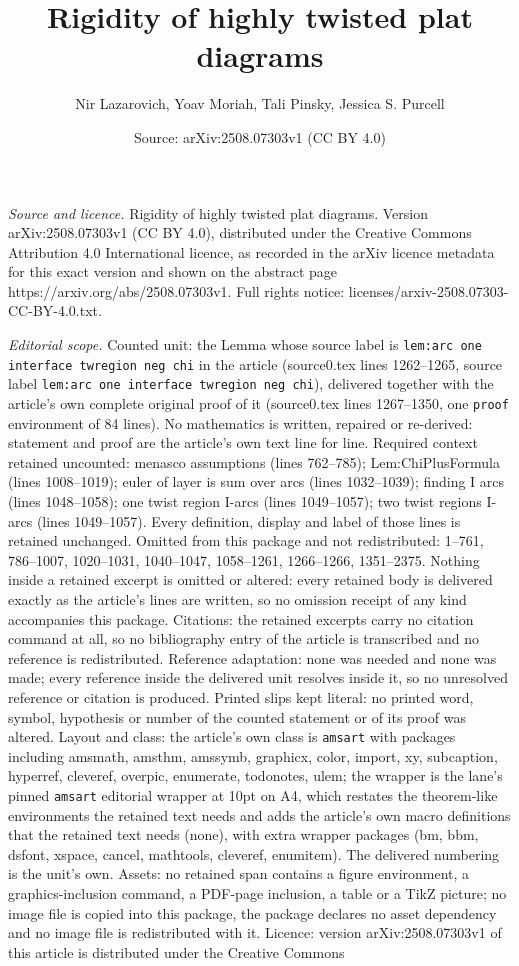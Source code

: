 \documentclass[10pt,a4paper]{amsart}
\title[Rigidity of highly twisted plat diagrams]{Rigidity of highly twisted plat diagrams}
\author{Nir Lazarovich, Yoav Moriah, Tali Pinsky, Jessica S. Purcell}
\date{Source: arXiv:2508.07303v1 (CC BY 4.0)}
\begin{document}
\maketitle

\noindent\emph{Source and licence.} Rigidity of highly twisted plat diagrams. Version arXiv:2508.07303v1 (CC BY 4.0), distributed under the Creative Commons Attribution 4.0 International licence, as recorded in the arXiv licence metadata for this exact version and shown on the abstract page https://arxiv.org/abs/2508.07303v1. Full rights notice: licenses/arxiv-2508.07303-CC-BY-4.0.txt.\par\smallskip

\noindent\textit{Editorial scope.} Counted unit: the Lemma whose source label is \texttt{lem:arc one interface twregion neg chi} in the article (source0.tex lines 1262--1265, source label \texttt{lem:arc one interface twregion neg chi}), delivered together with the article's own complete original proof of it (source0.tex lines 1267--1350, one \texttt{proof} environment of 84 lines). No mathematics is written, repaired or re-derived: statement and proof are the article's own text line for line. Required context retained uncounted: menasco assumptions (lines 762--785); Lem:ChiPlusFormula (lines 1008--1019); euler of layer is sum over arcs (lines 1032--1039); finding I arcs (lines 1048--1058); one twist region I-arcs (lines 1049--1057); two twist regions I-arcs (lines 1049--1057). Every definition, display and label of those lines is retained unchanged. Omitted from this package and not redistributed: 1--761, 786--1007, 1020--1031, 1040--1047, 1058--1261, 1266--1266, 1351--2375. Nothing inside a retained excerpt is omitted or altered: every retained body is delivered exactly as the article's lines are written, so no omission receipt of any kind accompanies this package. Citations: the retained excerpts carry no citation command at all, so no bibliography entry of the article is transcribed and no reference is redistributed. Reference adaptation: none was needed and none was made; every reference inside the delivered unit resolves inside it, so no unresolved reference or citation is produced. Printed slips kept literal: no printed word, symbol, hypothesis or number of the counted statement or of its proof was altered. Layout and class: the article's own class is \texttt{amsart} with packages including amsmath, amsthm, amssymb, graphicx, color, import, xy, subcaption, hyperref, cleveref, overpic, enumerate, todonotes, ulem; the wrapper is the lane's pinned \texttt{amsart} editorial wrapper at 10pt on A4, which restates the theorem-like environments the retained text needs and adds the article's own macro definitions that the retained text needs (none), with extra wrapper packages (bm, bbm, dsfont, xspace, cancel, mathtools, cleveref, enumitem). The delivered numbering is the unit's own. Assets: no retained span contains a figure environment, a graphics-inclusion command, a PDF-page inclusion, a table or a TikZ picture; no image file is copied into this package, the package declares no asset dependency and no image file is redistributed with it. Licence: version arXiv:2508.07303v1 of this article is distributed under the Creative Commons 
\end{document}
